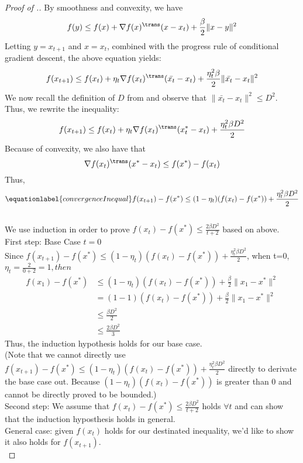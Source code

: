 \begin{proof}[Proof of .]
By smoothness and convexity, we have
$$ f(y) \leq f(x) +\nabla f(x) ^\trans (x-x_t) + \frac{\beta}{2} \| x-y \| ^2 $$
Letting $ y = x_{t+1} $ and $x= x_t$, combined with the progress rule of conditional gradient descent, the above equation yields:
$$ f(x_{t+1}) \leq f(x_t) + \eta_t \nabla f(x_t) ^\trans (\bar{x_t} - x_t) + \frac{\eta_t^2\beta}{2} \| \bar{x_t} - x_t \| ^2 $$
We now recall the definition of $D$ from  and observe that $\| \bar{x_t} - x_t \| ^2 \leq D^2$. Thus, we rewrite the inequality:
$$ f(x_{t+1}) \leq f(x_t) + \eta_t \nabla f(x_t) ^\trans (x_t^* - x_t) + \frac{\eta_t^2\beta D ^2}{2} $$
Because of convexity, we also have that
$$ \nabla f(x_t) ^\trans (x^*-x_t) \leq f(x^*) - f(x_t) $$
Thus,
\begin{equation}
\equationlabel{convergenceInequal}
f(x_{t+1})-f(x^*) \leq (1-\eta_t)(f(x_t)-f(x^*)) + \frac{\eta_t^2\beta D ^2}{2}
\end{equation}
\\We use induction in order to prove $f(x_t)-f(x^*) \leq \frac{2\beta D^2}{t+2}$  based on  above.\\
First step: Base Case $t=0$ \\
Since $ f(x_{t+1})-f(x^*) \leq (1-\eta_t)(f(x_t)-f(x^*)) + \frac{\eta_t^2\beta D ^2}{2}$, when t=0, $\eta_t =\frac{2}{0+2}=1, then $
\begin{align*} f(x_1)-f(x^*) &\leq (1-\eta_t)(f(x_t)-f(x^*)) + \frac{\beta}{2}\| x_1-x^* \|^2 \\
&= (1-1)(f(x_t)-f(x^*)) + \frac{\beta}{2}\| x_1-x^* \|^2 \\
&\leq \frac{\beta D^2}{2}\\
&\leq \frac{2\beta D^2}{3}
\end{align*}
Thus, the induction hypothesis holds for our base case. \\
(Note that we cannot directly use $f(x_{t+1})-f(x^*) \leq (1-\eta_t)(f(x_t)-f(x^*)) + \frac{\eta_t^2\beta D ^2}{2}$ directly to derivate the base case out. Because $(1-\eta_t)(f(x_t)-f(x^*))$ is greater than 0 and cannot be directly proved to be bounded.)\\
Second step: We assume that $f(x_t)-f(x^*) \leq \frac{2\beta D^2}{t+2}$ holds $\forall t$ and can show that the induction hyposthesis holds in general.\\
General case: given $f(x_t)$ holds for our destinated inequality, we'd like to show it also holds for $f(x_{t+1})$. \\

\end{proof}
